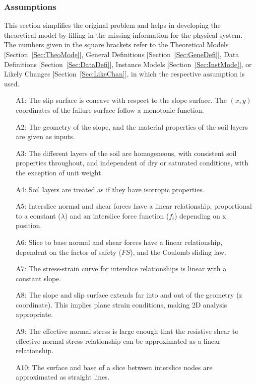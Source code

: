 \documentclass[12pt]{article}
\begin{document}
\subsubsection{Assumptions}
\label{Sec:Assu}
This section simplifies the original problem and helps in developing the theoretical model by filling in the missing information for the physical system. The numbers given in the square brackets refer to the Theoretical Models [Section~\ref{Sec:TheoMode}], General Definitions [Section~\ref{Sec:GeneDefi}], Data Definitions [Section~\ref{Sec:DataDefi}], Instance Models [Section~\ref{Sec:InstMode}], or Likely Changes [Section~\ref{Sec:LikeChan}], in which the respective assumption is used.
\begin{itemize}
\item[A1:]The slip surface is concave with respect to the slope surface. The $(x,y)$ coordinates of the failure surface follow a monotonic function.
\item[A2:]The geometry of the slope, and the material properties of the soil layers are given as inputs.
\item[A3:]The different layers of the soil are homogeneous, with consistent soil properties throughout, and independent of dry or saturated conditions, with the exception of unit weight.
\item[A4:]Soil layers are treated as if they have isotropic properties.
\item[A5:]Interslice normal and shear forces have a linear relationship, proportional to a constant ($\lambda{}$) and an interslice force function ($f_{i}$) depending on x position.
\item[A6:]Slice to base normal and shear forces have a linear relationship, dependent on the factor of safety ($FS$), and the Coulomb sliding law.
\item[A7:]The stress-strain curve for interslice relationships is linear with a constant slope.
\item[A8:]The slope and slip surface extends far into and out of the geometry (z coordinate). This implies plane strain conditions, making 2D analysis appropriate.
\item[A9:]The effective normal stress is large enough that the resistive shear to effective normal stress relationship can be approximated as a linear relationship.
\item[A10:]The surface and base of a slice between interslice nodes are approximated as straight lines.
\end{itemize}
\end{document}
